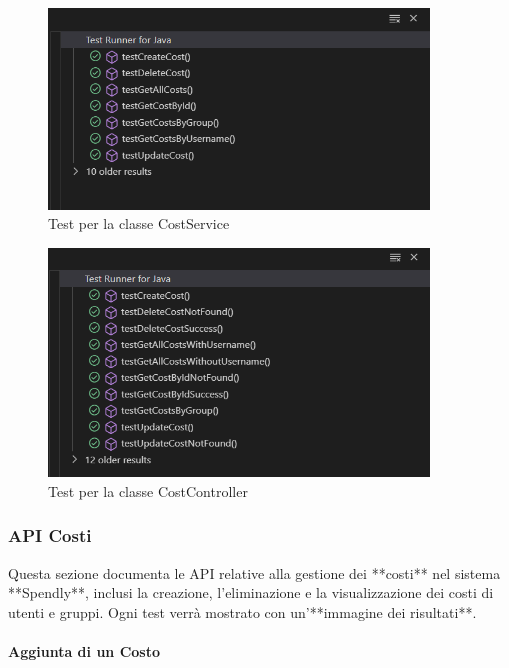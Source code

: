 \begin{figure}[H]
    \centering
    \includegraphics[width=0.9\textwidth]{images/CostServiceTest_iter2.png}
    \caption{Test per la classe CostService}
    \label{fig:CostServiceTest_iter2}
\end{figure}

\begin{figure}[H]
    \centering
    \includegraphics[width=0.9\textwidth]{images/CostControllerTest_iter2.png}
    \caption{Test per la classe CostController}
    \label{fig:CostControllerTest_iter2}
\end{figure}



\subsubsection{API Costi}

Questa sezione documenta le API relative alla gestione dei **costi** nel sistema **Spendly**, inclusi la creazione, l'eliminazione e la visualizzazione dei costi di utenti e gruppi. Ogni test verrà mostrato con un'**immagine dei risultati**.

\paragraph{Aggiunta di un Costo}  

